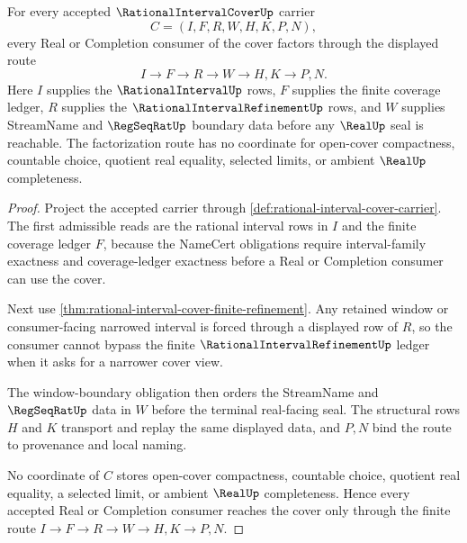 \begin{theorem}
\label{thm:rational-interval-cover-finite-consumer-factorization}
For every accepted $\RationalIntervalCoverUp$ carrier
$$
C=(I,F,R,W,H,K,P,N),
$$
every Real or Completion consumer of the cover factors through the displayed route
$$
I \to F \to R \to W \to H,K \to P,N.
$$
Here $I$ supplies the $\RationalIntervalUp$ rows, $F$ supplies the finite coverage ledger, $R$ supplies the $\RationalIntervalRefinementUp$ rows, and $W$ supplies StreamName and $\RegSeqRatUp$ boundary data before any $\RealUp$ seal is reachable. The factorization route has no coordinate for open-cover compactness, countable choice, quotient real equality, selected limits, or ambient $\RealUp$ completeness.
\end{theorem}
\begin{proof}
Project the accepted carrier through \autoref{def:rational-interval-cover-carrier}. The first admissible reads are the rational interval rows in $I$ and the finite coverage ledger $F$, because the NameCert obligations require interval-family exactness and coverage-ledger exactness before a Real or Completion consumer can use the cover.

Next use \autoref{thm:rational-interval-cover-finite-refinement}. Any retained window or consumer-facing narrowed interval is forced through a displayed row of $R$, so the consumer cannot bypass the finite $\RationalIntervalRefinementUp$ ledger when it asks for a narrower cover view.

The window-boundary obligation then orders the StreamName and $\RegSeqRatUp$ data in $W$ before the terminal real-facing seal. The structural rows $H$ and $K$ transport and replay the same displayed data, and $P,N$ bind the route to provenance and local naming.

No coordinate of $C$ stores open-cover compactness, countable choice, quotient real equality, a selected limit, or ambient $\RealUp$ completeness. Hence every accepted Real or Completion consumer reaches the cover only through the finite route $I \to F \to R \to W \to H,K \to P,N$.
\end{proof}


